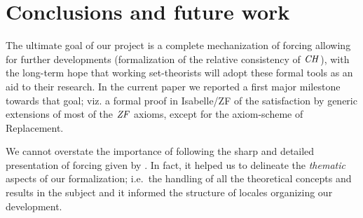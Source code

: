 \section{Conclusions and future work}
\label{sec:conclusions-future-work}

The ultimate goal of our project is a complete mechanization of
forcing allowing for further developments (formalization of the
relative consistency of $\mathit{CH}$), with the long-term hope that 
working set-theorists will adopt these formal tools as an aid to their
research. In the current paper we reported a first major
milestone towards that goal; viz. a formal proof in Isabelle/ZF of the
satisfaction by generic extensions of most of the $\mathit{ZF}$ axioms, except
for the axiom-scheme of Replacement.

We cannot overstate the importance of following the sharp and detailed 
presentation of forcing given by
\citet{kunen2011set}. In fact, it helped us to delineate the
\emph{thematic} aspects of our formalization; i.e.~the handling of all
the theoretical concepts and results in the subject and it informed
the structure of locales organizing our development.




